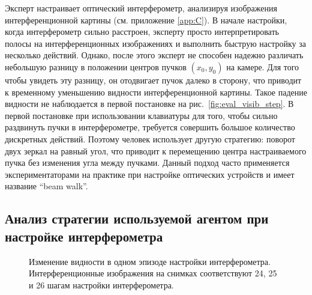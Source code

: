 Эксперт настраивает оптический интерферометр, анализируя изображения интерференционной картины (см. приложение \ref{app:C}). В начале настройки, когда интерферометр сильно расстроен, эксперту просто интерпретировать полосы на интерференционных изображениях и выполнить быструю настройку за несколько действий. Однако, после этого эксперт не способен надежно различать небольшую разницу в положении центров пучков $(x_0,y_0)$ на камере. Для того чтобы увидеть эту разницу, он отодвигает пучок далеко в сторону, что приводит к временному уменьшению видности интерференционной картины. Такое падение видности не наблюдается в первой постановке на рис.~\ref{fig:eval_visib_step}. В первой постановке при использовании клавиатуры для того, чтобы сильно раздвинуть пучки в интерферометре,  требуется совершить большое количество дискретных действий. Поэтому человек использует другую стратегию: поворот двух зеркал на равный угол, что приводит к перемещению центра настраиваемого пучка без изменения угла между пучками. Данный подход часто применяется экспериментаторами на практике при настройке оптических устройств и имеет название ``beam walk''. 


\subsection{Анализ стратегии используемой агентом при настройке интерферометра}

\begin{figure}[ht]
\caption{Изменение видности в одном эпизоде настройки интерферометра. Интерференционные изображения на снимках соответствуют 24, 25 и 26 шагам настройки интерферометра. 
}
\label{fig:anal_visib_step}
\end{figure}

